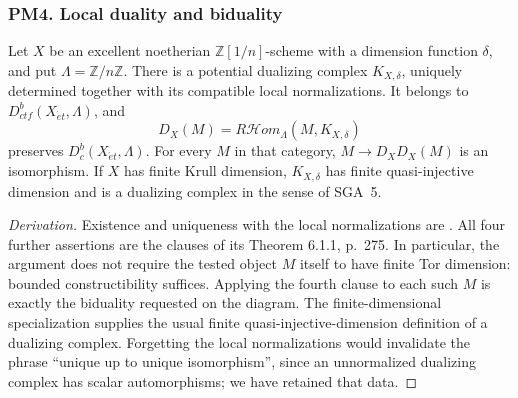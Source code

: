 \subsubsection{PM4. Local duality and biduality}
\begin{theorem}\label{B:PM4}
Let $X$ be an excellent noetherian $\mathbb Z[1/n]$-scheme with a dimension function $\delta$, and put $\Lambda=\mathbb Z/n\mathbb Z$. There is a potential dualizing complex $K_{X,\delta}$, uniquely determined together with its compatible local normalizations. It belongs to $D^b_{ctf}(X_{\acute et},\Lambda)$, and
\[
 D_X(M)=R\mathcal Hom_\Lambda(M,K_{X,\delta})
\]
preserves $D^b_c(X_{\acute et},\Lambda)$. For every $M$ in that category, $M\to D_XD_X(M)$ is an isomorphism. If $X$ has finite Krull dimension, $K_{X,\delta}$ has finite quasi-injective dimension and is a dualizing complex in the sense of SGA~5.
\end{theorem}
\begin{proof}[Derivation]
Existence and uniqueness with the local normalizations are \cite[Expos\'e XVII, Theorem 5.1.1, p.~269]{BILO2014}. All four further assertions are the clauses of its Theorem 6.1.1, p.~275. In particular, the argument does not require the tested object $M$ itself to have finite Tor dimension: bounded constructibility suffices. Applying the fourth clause to each such $M$ is exactly the biduality requested on the diagram. The finite-dimensional specialization supplies the usual finite quasi-injective-dimension definition of a dualizing complex. Forgetting the local normalizations would invalidate the phrase ``unique up to unique isomorphism'', since an unnormalized dualizing complex has scalar automorphisms; we have retained that data.
\end{proof}

